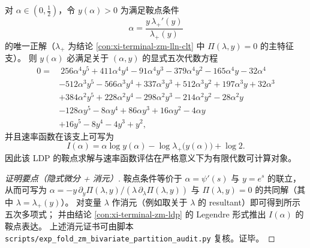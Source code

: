 



\begin{conclusion}\label{con:xi-terminal-zm-ldp-saddle-quintic}
对 \(\alpha\in(0,\tfrac12)\)，令 \(y(\alpha)>0\) 为满足鞍点条件
\[
\alpha=\frac{y\,\lambda_+'(y)}{\lambda_+(y)}
\]
的唯一正解（\(\lambda_+\) 为结论 \ref{con:xi-terminal-zm-lln-clt} 中 \(\Pi(\lambda,y)=0\) 的主特征支）。
则 \(y(\alpha)\) 必满足关于 \((\alpha,y)\) 的显式五次代数方程
\[
\begin{aligned}
0=&\ 256\alpha^4y^5+411\alpha^4y^4-91\alpha^4y^3-379\alpha^4y^2-165\alpha^4y-32\alpha^4\\
&-512\alpha^3y^5-566\alpha^3y^4+337\alpha^3y^3+512\alpha^3y^2+197\alpha^3y+32\alpha^3\\
&+384\alpha^2y^5+228\alpha^2y^4-298\alpha^2y^3-214\alpha^2y^2-28\alpha^2y\\
&-128\alpha y^5-8\alpha y^4+86\alpha y^3+16\alpha y^2-4\alpha y\\
&+16y^5-8y^4-4y^3+y^2,
\end{aligned}
\]
并且速率函数在该支上可写为
\[
I(\alpha)=\alpha\log y(\alpha)-\log \lambda_+\!\bigl(y(\alpha)\bigr)+\log 2.
\]
因此该 LDP 的鞍点求解与速率函数评估在严格意义下为有限代数可计算对象。
\end{conclusion}
\begin{proof}[证明要点（隐式微分 + 消元）]
鞍点条件等价于 \(\alpha=\psi'(s)\) 与 \(y=e^s\) 的联立，从而可写为
\(\alpha=-y\,\partial_y\Pi(\lambda,y)/(\lambda\,\partial_\lambda\Pi(\lambda,y))\) 与 \(\Pi(\lambda,y)=0\) 的共同解（其中 \(\lambda=\lambda_+(y)\)）。
对变量 \(\lambda\) 作消元（例如取关于 \(\lambda\) 的 resultant）即可得到所示五次多项式；
并由结论 \ref{con:xi-terminal-zm-ldp} 的 Legendre 形式推出 \(I(\alpha)\) 的鞍点表达。
上述消元证书可由脚本 \texttt{scripts/exp\_fold\_zm\_bivariate\_partition\_audit.py} 复核。证毕。
\end{proof}

